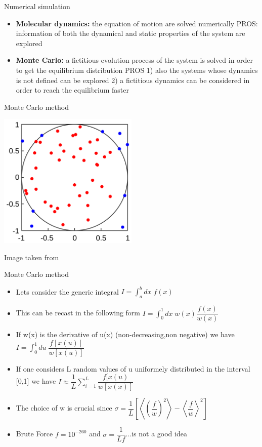 \documentclass{beamer}
\begin{document}
\begin{frame}{Numerical simulation \cite{peliti2011statistical}}
\begin{itemize}
\item\textbf{Molecular dynamics:} the equation of motion are solved numerically PROS: information of both the dynamical and static properties of the system are explored 
\item\textbf{Monte Carlo:} a fictitious evolution process of the system is solved in order to get the equilibrium distribution PROS  1) also the systems whose dynamics is not defined can be explored 2) a fictitious dynamics can be considered in order to reach the equilibrium faster 
\end{itemize}
\end{frame}


\begin{frame} {Monte Carlo method \cite{frenkel2001understanding}}
 \begin{center}
     \includegraphics[width=0.5\textwidth]{Pic/MonteCarloIntegrationCircle.png}
\end{center}
 \begin{center}
Image taken from \cite{PBC}
\end{center}
\end{frame}




\begin{frame}{Monte Carlo method \cite{frenkel2001understanding}}
\begin{itemize}
\item Lets consider the generic integral $I=\int^{b}_{a}dx\;f(x)$
\item This can be recast in the following form  $I=\int^{1}_{0}dx\;w(x)\dfrac{f(x)}{w(x)}$
\item If w(x) is the derivative of u(x) (non-decreasing,non negative) we have $I=\int^{1}_{0}du\;\dfrac{f[x(u)]}{w[x(u)]}$
\item If one considers L random values of u uniformely distributed in the interval [0,1] we have $I\approx\dfrac{1}{L}\sum_{i=1}^{L}\dfrac{f[x(u)}{w[x(x)]}$
 \item The choice of w is crucial since $\sigma=\dfrac{1}{L}\left[\left\langle\left(\dfrac{f}{w}\right)^{2}\right\rangle-  \left\langle\dfrac{f}{w}\right\rangle^{2}\right]$
 \item Brute Force $f=10^{-260}$ and $\sigma=\dfrac{1}{Lf}$...is not a good idea



\end{itemize}
\end{frame}
\end{document}
